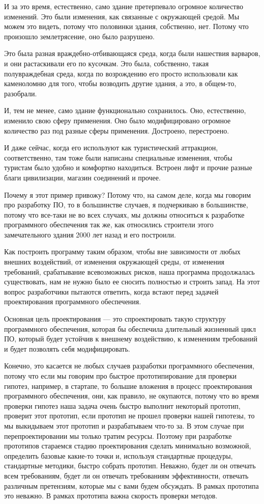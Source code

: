 И за это время, естественно, само здание претерпевало огромное количество изменений. Это были изменения, как связанные с окружающей средой. Мы можем это видеть, потому что половинки здания, собственно, нет. Потому что произошло землетрясение, оно было разрушено.

Это была разная враждебно-отбивающаяся среда, когда были нашествия варваров, и они растаскивали его по кусочкам. Это была, собственно, такая полувраждебная среда, когда по возрождению его просто использовали как каменоломню для того, чтобы возводить другие здания, а это, в общем-то, разобрали.

И, тем не менее, само здание функционально сохранилось. Оно, естественно, изменило свою сферу применения. Оно было модифицировано огромное количество раз под разные сферы применения. Достроено, перестроено.

И даже сейчас, когда его используют как туристический аттракцион, соответственно, там тоже были написаны специальные изменения, чтобы туристам было удобно и комфортно находиться. Встроен лифт и прочие разные благи цивилизации, магазин соединений и прочее. 

Почему я этот пример привожу? Потому что, на самом деле, когда мы говорим про разработку ПО, то в большинстве случаев, я подчеркиваю в большинстве, потому что все-таки не во всех случаях, мы должны относиться к разработке программного обеспечения так же, как относились строители этого замечательного здания 2000 лет назад и его построили. 

Как построить программу таким образом, чтобы вне зависимости от любых внешних воздействий, от изменения окружающей среды, от изменения требований, срабатывание всевозможных рисков, наша программа продолжалась существовать, нам не нужно было ее сносить полностью и строить запад. На этот вопрос разработчики пытаются ответить, когда встают перед задачей проектирования программного обеспечения.

Основная цель проектирования --- это спроектировать такую структуру программного обеспечения, которая бы обеспечила длительный жизненный цикл ПО, который будет устойчив к внешнему воздействию, к изменениям требований и будет позволять себя модифицировать.

Конечно, это касается не любых случаев разработки программного обеспечения, потому что если мы говорим про быстрое прототипирование для проверки гипотез, например, в стартапе, то большие вложения в процесс проектирования программного обеспечения, они, как правило, не окупаются, потому что во время проверки гипотез наша задача очень быстро выполнит некоторый прототип, проверит этот прототип, если прототип не прошел проверки нашей гипотезы, то мы выкидываем этот прототип и разрабатываем что-то за. В этом случае при перепроектировании мы только тратим ресурсы. Поэтому при разработке прототипов стараемся стадию проектирования сделать минимально возможной, определить базовые какие-то точки и, используя стандартные процедуры, стандартные методики, быстро собрать прототип. Неважно, будет ли он отвечать всем требованиям, будет ли он отвечать требованиям эффективности, отвечать различным претензиям, которые мы с вами будем обсуждать. В рамках прототипа это неважно. В рамках прототипа важна скорость проверки методов.

